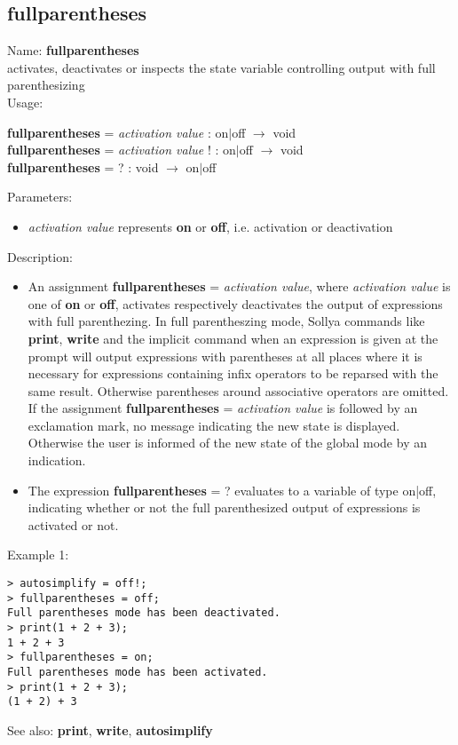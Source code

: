 \subsection{ fullparentheses }
\noindent Name: \textbf{fullparentheses}\\
activates, deactivates or inspects the state variable controlling output with full parenthesizing\\

\noindent Usage: 
\begin{center}
\textbf{fullparentheses} = \emph{activation value} : \textsf{on$|$off} $\rightarrow$ \textsf{void}\\
\textbf{fullparentheses} = \emph{activation value} ! : \textsf{on$|$off} $\rightarrow$ \textsf{void}\\
\textbf{fullparentheses} = ? : \textsf{void} $\rightarrow$ \textsf{on$|$off}\\
\end{center}
Parameters: 
\begin{itemize}
\item \emph{activation value} represents \textbf{on} or \textbf{off}, i.e. activation or deactivation
\end{itemize}
\noindent Description: \begin{itemize}

\item An assignment \textbf{fullparentheses} = \emph{activation value}, where \emph{activation value}
   is one of \textbf{on} or \textbf{off}, activates respectively deactivates the output
   of expressions with full parenthezing. In full parentheszing mode,
   Sollya commands like \textbf{print}, \textbf{write} and the implicit command when an
   expression is given at the prompt will output expressions with
   parentheses at all places where it is necessary for expressions
   containing infix operators to be reparsed with the same
   result. Otherwise parentheses around associative operators are
   omitted.
   If the assignment \textbf{fullparentheses} = \emph{activation value} is followed by an
   exclamation mark, no message indicating the new state is
   displayed. Otherwise the user is informed of the new state of the
   global mode by an indication.

\item The expression \textbf{fullparentheses} = ? evaluates to a variable of type
   \textsf{on|off}, indicating whether or not the full parenthesized output
   of expressions is activated or not.
\end{itemize}
\noindent Example 1: 
\begin{center}\begin{minipage}{15cm}\begin{Verbatim}[frame=single]
> autosimplify = off!;
> fullparentheses = off;
Full parentheses mode has been deactivated.
> print(1 + 2 + 3);
1 + 2 + 3
> fullparentheses = on;
Full parentheses mode has been activated.
> print(1 + 2 + 3);
(1 + 2) + 3
\end{Verbatim}
\end{minipage}\end{center}
See also: \textbf{print}, \textbf{write}, \textbf{autosimplify}
